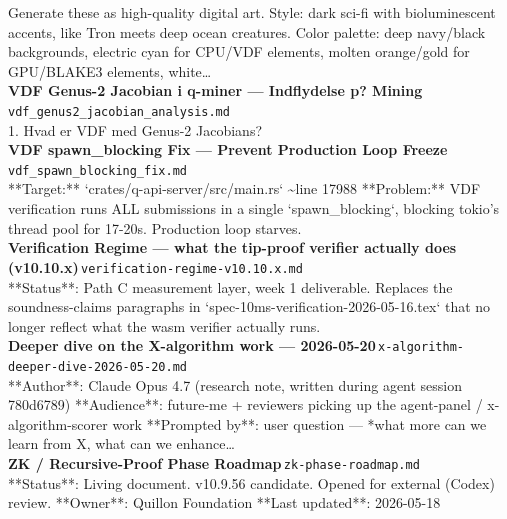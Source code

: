 \documentclass[11pt,a4paper]{article}
\begin{document}
Generate these as high-quality digital art. Style: dark sci-fi with bioluminescent accents, like Tron meets deep ocean creatures. Color palette: deep navy/black backgrounds, electric cyan for CPU/VDF elements, molten orange/gold for GPU/BLAKE3 elements, white\ldots{}\\[6pt]
\noindent\textbf{VDF Genus-2 Jacobian i q-miner --- Indflydelse p? Mining}\,\textcolor{qgray}{\small \texttt{vdf\_genus2\_jacobian\_analysis.md}}\\
1. Hvad er VDF med Genus-2 Jacobians?\\[6pt]
\noindent\textbf{VDF spawn\_blocking Fix --- Prevent Production Loop Freeze}\,\textcolor{qgray}{\small \texttt{vdf\_spawn\_blocking\_fix.md}}\\
**Target:** `crates/q-api-server/src/main.rs` \textasciitilde{}line 17988 **Problem:** VDF verification runs ALL submissions in a single `spawn\_blocking`, blocking tokio's thread pool for 17-20s. Production loop starves.\\[6pt]
\noindent\textbf{Verification Regime --- what the tip-proof verifier actually does (v10.10.x)}\,\textcolor{qgray}{\small \texttt{verification-regime-v10.10.x.md}}\\
**Status**: Path C measurement layer, week 1 deliverable. Replaces the soundness-claims paragraphs in `spec-10ms-verification-2026-05-16.tex` that no longer reflect what the wasm verifier actually runs.\\[6pt]
\noindent\textbf{Deeper dive on the X-algorithm work --- 2026-05-20}\,\textcolor{qgray}{\small \texttt{x-algorithm-deeper-dive-2026-05-20.md}}\\
**Author**: Claude Opus 4.7 (research note, written during agent session 780d6789) **Audience**: future-me + reviewers picking up the agent-panel / x-algorithm-scorer work **Prompted by**: user question --- *what more can we learn from X, what can we enhance\ldots{}\\[6pt]
\noindent\textbf{ZK / Recursive-Proof Phase Roadmap}\,\textcolor{qgray}{\small \texttt{zk-phase-roadmap.md}}\\
**Status**: Living document. v10.9.56 candidate. Opened for external (Codex) review. **Owner**: Quillon Foundation **Last updated**: 2026-05-18\\[6pt]
\end{document}
